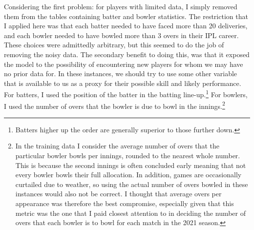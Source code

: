 Considering the first problem: for players with limited data, I simply removed them from the tables containing batter and bowler statistics. The restriction that I applied here was that each batter needed to have faced more than 20 deliveries, and each bowler needed to have bowled more than 3 overs in their IPL career. These choices were admittedly arbitrary, but this seemed to do the job of removing the noisy data. The secondary benefit to doing this, was that it exposed the model to the possibility of encountering new players for whom we may have no prior data for. In these instances, we should try to use some other variable that is available to us as a proxy for their possible skill and likely performance. For batters, I used the position of the batter in the batting line-up.\footnote{Batters higher up the order are generally superior to those further down.} For bowlers, I used the number of overs that the bowler is due to bowl in the innings.\footnote{In the training data I consider the average number of overs that the particular bowler bowls per innings, rounded to the nearest whole number. This is because the second innings is often concluded early meaning that not every bowler bowls their full allocation. In addition, games are occasionally curtailed due to weather, so using the actual number of overs bowled in these instances would also not be correct. I thought that average overs per appearance was therefore the best compromise, especially given that this metric was the one that I paid closest attention to in deciding the number of overs that each bowler is to bowl for each match in the 2021 season.}

